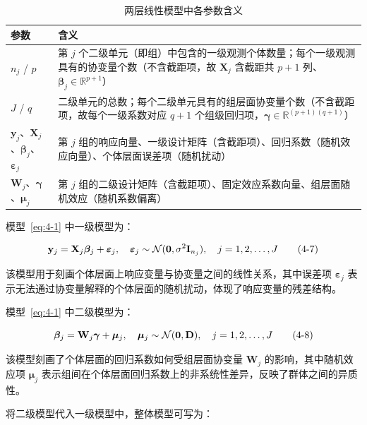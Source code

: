 \documentclass[12pt,a4paper]{ctexart}
\makeatletter
\numberwithin{figure}{section}
\numberwithin{table}{section}
\let\ltx@orig@tag\tag
\renewcommand{\tag}[1]{\refstepcounter{equation}\ltx@orig@tag{#1}}%
\makeatother
\begin{document}
\begin{table}[H]
\centering
\caption{两层线性模型中各参数含义}
\label{tab:params}
\begin{tabular}{p{}p{}}
\toprule
参数 & 含义 \\
\midrule
$n_j$ / $p$ & 第 $j$ 个二级单元（即组）中包含的一级观测个体数量；每个一级观测具有的协变量个数（不含截距项，故 $\mathbf{X}_j$ 含截距共 $p+1$ 列、$\boldsymbol{\beta}_j\in\mathbb{R}^{p+1}$） \\
$J$ / $q$ & 二级单元的总数；每个二级单元具有的组层面协变量个数（不含截距项，故每个一级系数对应 $q+1$ 个组级回归项，$\boldsymbol{\gamma}\in\mathbb{R}^{(p+1)(q+1)}$） \\
$\mathbf{y}_j$、$\mathbf{X}_j$、$\boldsymbol{\beta}_j$、$\boldsymbol{\varepsilon}_j$ & 第 $j$ 组的响应向量、一级设计矩阵（含截距项）、回归系数（随机效应向量）、个体层面误差项（随机扰动） \\
$\mathbf{W}_j$、$\boldsymbol{\gamma}$、$\boldsymbol{\mu}_j$ & 第 $j$ 组的二级设计矩阵（含截距项）、固定效应系数向量、组层面随机效应（随机系数偏离） \\
\bottomrule
\end{tabular}
\end{table}

模型~\eqref{eq:4-1} 中一级模型为：

\begin{equation}
\mathbf{y}_j = \mathbf{X}_j \boldsymbol{\beta}_j + \boldsymbol{\varepsilon}_j, \quad \boldsymbol{\varepsilon}_j \sim \mathcal{N}(\mathbf{0}, \sigma^2 \mathbf{I}_{n_j}), \quad j = 1, 2, \dots, J
\tag{4-7}
\end{equation}

该模型用于刻画个体层面上响应变量与协变量之间的线性关系，其中误差项 $\boldsymbol{\varepsilon}_j$ 表示无法通过协变量解释的个体层面的随机扰动，体现了响应变量的残差结构。

模型~\eqref{eq:4-1} 中二级模型为：

\begin{equation}
\boldsymbol{\beta}_j = \mathbf{W}_j \boldsymbol{\gamma} + \boldsymbol{\mu}_j, \quad \boldsymbol{\mu}_j \sim \mathcal{N}(\mathbf{0}, \mathbf{D}), \quad j = 1, 2, \dots, J
\tag{4-8}
\end{equation}

该模型刻画了个体层面的回归系数如何受组层面协变量 $\mathbf{W}_j$ 的影响，其中随机效应项 $\boldsymbol{\mu}_j$ 表示组间在个体层面回归系数上的非系统性差异，反映了群体之间的异质性。

将二级模型代入一级模型中，整体模型可写为：
\end{document}
